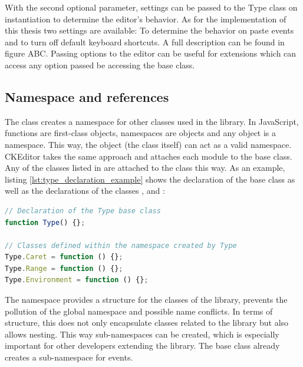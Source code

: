 With the second optional parameter, settings can be passed to the Type class on instantiation to determine the editor's behavior. As for the implementation of this thesis two settings are available: To determine the behavior on paste events and to turn off default keyboard shortcuts. A full description can be found in figure ABC. Passing options to the editor can be useful for extensions which can access any option passed be accessing the  base class.

\subsection{Namespace and references} 
\label{subsec:namespace_and_refs}

The  class creates a namespace for other classes used in the library. In JavaScript, functions are first-class objects, namespaces are objects and any object is a namespace. This way, the   object (the class itself) can act as a valid namespace. CKEditor takes the same approach and attaches each module to the  base class. Any of the classes listed in  are attached to the  class this way. As an example, listing \ref{lst:type_declaration_example} shows the declaration of the  base class as well as the declarations of the classes ,  and :

\begin{lstlisting}[language=JavaScript, caption={Declaration of Caret, Range and Environment classes}, label=lst:type_declaration_example]
// Declaration of the Type base class
function Type() {};

// Classes defined within the namespace created by Type
Type.Caret = function () {};
Type.Range = function () {};
Type.Environment = function () {};
\end{lstlisting}

The namespace provides a structure for the classes of the library, prevents the pollution of the global namespace and possible name conflicts. In terms of structure, this does not only encapsulate classes related to the library but also allows nesting. This way sub-namespaces can be created, which is especially important for other developers extending the library. The  base class already creates a sub-namespace  for events.

